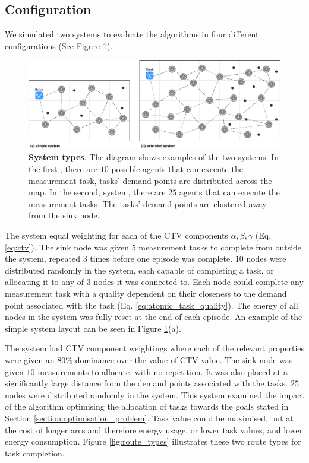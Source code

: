 \subsection{Configuration}

We simulated two systems to evaluate the algorithms in four different configurations (See Figure \ref{fig:system-types}).

\begin{figure}[ht]
	\centering
	\includegraphics[width=0.9\linewidth]{system-types}
	\caption{\textbf{System types}. The diagram shows examples of the two systems. In the first \simulationSimple{}{}, there are $10$ possible agents that can execute the measurement task, tasks' demand points are distributed across the map. In the second, \simulationExtended{}{} system, there are $25$ agents that can execute the measurement tasks. The tasks' demand points are clustered away from the sink node.}
	\label{fig:system-types}
\end{figure}

The \simulationSimple{}{} system  equal weighting for each of the CTV components $\alpha, \beta, \gamma$ (Eq. \ref{eq:ctv}). The sink node was given $5$ measurement tasks to complete from outside the system, repeated $3$ times before one episode was complete. $10$ nodes were distributed randomly in the system, each capable of completing a task, or allocating it to any of $3$ nodes it was connected to. Each node could complete any measurement task with a quality dependent on their closeness to the demand point associated with the task (Eq. \ref{eq:atomic_task_quality}). The energy of all nodes in the system was fully reset at the end of each episode. An example of the simple system layout can be seen in Figure \ref{fig:system-types}(a). 

The \simulationExtended{}{} system had CTV component weightings where each of the relevant properties were given an $80\%$ dominance over the value of CTV value. The sink node was given $10$ measurements to allocate, with no repetition. It was also placed at a significantly large distance from the demand points associated with the tasks. $25$ nodes were distributed randomly in the system. This system examined the impact of the algorithm optimising the allocation of tasks towards the goals stated in Section \ref{section:optimisation_problem}. Task value could be maximised, but at the cost of longer arcs and therefore energy usage, or lower task values, and lower energy consumption. Figure \ref{fig:route_types} illustrates these two route types for task completion.

